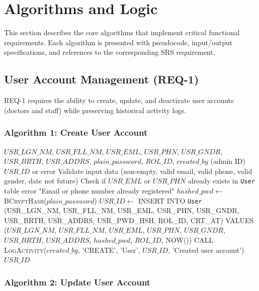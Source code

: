 \section{Algorithms and Logic}

This section describes the core algorithms that implement critical functional requirements. Each algorithm is presented with pseudocode, input/output specifications, and references to the corresponding SRS requirement.

\subsection{User Account Management (REQ-1)}

REQ-1 requires the ability to create, update, and deactivate user accounts (doctors and staff) while preserving historical activity logs.

\subsubsection{Algorithm 1: Create User Account}

\begin{algorithm}[H]
	\caption{Create User Account}
	\label{alg:create-user}
	\begin{algorithmic}[1]
		\REQUIRE $USR\_LGN\_NM$, $USR\_FLL\_NM$, $USR\_EML$, $USR\_PHN$, $USR\_GNDR$, $USR\_BRTH$, $USR\_ADDRS$, 
		$plain\_password$, $ROL\_ID$, $created\_by$ (admin ID)
		\ENSURE $USR\_ID$ or error
		\STATE Validate input data (non-empty, valid email, valid phone, valid gender, date not future)
		\STATE Check if $USR\_EML$ or $USR\_PHN$ already exists in \texttt{User} table
		\RETURN error "Email or phone number already registered"
		\ENDIF
		\STATE $hashed\_pwd \leftarrow$ \textsc{BCryptHash}($plain\_password$)
		\STATE $USR\_ID \leftarrow$ INSERT INTO \texttt{User} 
		(USR\_LGN\_NM, USR\_FLL\_NM, USR\_EML, USR\_PHN, USR\_GNDR, USR\_BRTH, USR\_ADDRS, 
		USR\_PWD\_HSH, ROL\_ID, CRT\_AT)
		VALUES ($USR\_LGN\_NM$, $USR\_FLL\_NM$, $USR\_EML$, $USR\_PHN$, $USR\_GNDR$, $USR\_BRTH$, $USR\_ADDRS$,
		$hashed\_pwd$, $ROL\_ID$, NOW())
		\STATE CALL \textsc{LogActivity}($created\_by$, 'CREATE', 'User', $USR\_ID$, 'Created user account')
		\RETURN $USR\_ID$
	\end{algorithmic}
\end{algorithm}

\subsubsection{Algorithm 2: Update User Account}

